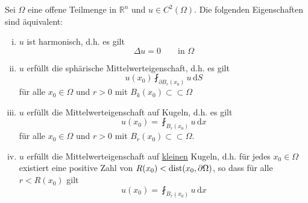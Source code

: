 \begin{satz}
	Sei $\Omega$ eine offene Teilmenge in $\mathbb{R}^n$ und $u \in C^2(\Omega)$. Die folgenden Eigenschaften sind äquivalent:
	\begin{enumerate}[(i)]
		\item $u$ ist harmonisch, d.h. es gilt 
		\begin{equation}
			\Delta u = 0 \qquad \text{in } \Omega
		\end{equation}
		\item $u$ erfüllt die sphärische Mittelwerteigenschaft, d.h. es gilt
		\begin{equation}
			u(x_0) \fint_{\partial B_r(x_0)}^{}u \,\mathrm{d}S
		\end{equation}
		für alle $x_0 \in \Omega$ und $r>0$ mit $B_k(x_0) \subset \subset \Omega$
		\item $u$ erfüllt die Mittelwerteigenschaft auf Kugeln, d.h. es gilt
		\begin{equation}
			u(x_0) = \fint_{B_r(x_0)}^{}u \,\mathrm{d}x
		\end{equation}
		für alle $x_0 \in \Omega$ und $r > 0$ mit $B_r(x_0) \subset \subset \Omega$.
		\item $u$ erfüllt die Mittelwerteigenschaft auf \underline{kleinen} Kugeln, d.h. für jedes $x_0 \in \Omega$ existiert eine positive Zahl von $R(x_0) < \operatorname{dist}(x_0,\partial \Omega)$, so dass für alle $r < R(x_0)$ gilt
		\begin{equation}
			u(x_0) = \fint_{B_r(x_0)}^{}u \,\mathrm{d}x
		\end{equation}
	\end{enumerate}
\end{satz}
